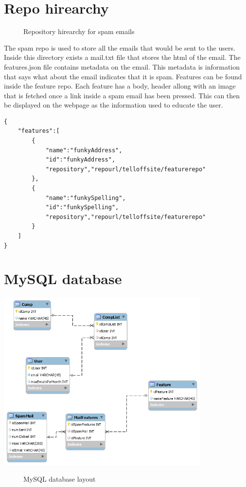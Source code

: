 \documentclass{article}
\begin{document}
\section{Repo hirearchy}

\begin{figure}[H]
\caption{Repository hirearchy for spam emails}
\end{figure}

The spam repo is used to store all the emails that would be sent to the users. Inside this directory exists a mail.txt file that stores the html of the email. The features.json file contains metadata on the email. This metadata is information that says what about the email indicates that it is spam. Features can be found inside the feature repo. Each feature has a body, header allong with an image that is fetched once a link inside a spam email has been pressed. This can then be displayed on the webpage as the information used to educate the user.

\begin{lstlisting}[frame=single, caption={features.json}]
{
    "features":[
        {
            "name":"funkyAddress",
            "id":"funkyAddress",
            "repository","repourl/telloffsite/featurerepo"
        },
        {
            "name":"funkySpelling",
            "id":"funkySpelling",
            "repository","repourl/telloffsite/featurerepo"
        }
    ]
}
\end{lstlisting}

\section{MySQL database}
\begin{center}
    \centering
    \includegraphics[width=0.8\textwidth]{database}
    \begin{figure}[H]
        \caption{MySQL database layout}
    \end{figure}
\end{center}
\end{document}
